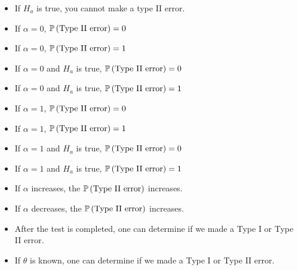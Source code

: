 \documentclass[12pt]{article}
\begin{document}
\begin{enumerate}
{\begin{itemize}
\item If $H_a$ is true, you cannot make a type II error.
\item If $\alpha = 0$, $\mathbb{P}\left(\text{Type II error}\right) = 0$ 
\item If $\alpha = 0$, $\mathbb{P}\left(\text{Type II error}\right) = 1$ 
\item If $\alpha = 0$ and $H_a$ is true, $\mathbb{P}\left(\text{Type II error}\right) = 0$ 
\item If $\alpha = 0$ and $H_a$ is true, $\mathbb{P}\left(\text{Type II error}\right) = 1$
\item If $\alpha = 1$, $\mathbb{P}\left(\text{Type II error}\right) = 0$ 
\item If $\alpha = 1$, $\mathbb{P}\left(\text{Type II error}\right) = 1$ 
\item If $\alpha = 1$ and $H_a$ is true, $\mathbb{P}\left(\text{Type II error}\right) = 0$ 
\item If $\alpha = 1$ and $H_a$ is true, $\mathbb{P}\left(\text{Type II error}\right) = 1$
\item If $\alpha$ increases, the $\mathbb{P}\left(\text{Type II error}\right)$ increases.
\item If $\alpha$ decreases, the $\mathbb{P}\left(\text{Type II error}\right)$ increases.
\item After the test is completed, one can determine if we made a Type I or Type II error.
\item If $\theta$ is known, one can determine if we made a Type I or Type II error.
\end{itemize}
}
\end{enumerate}
\end{document}
